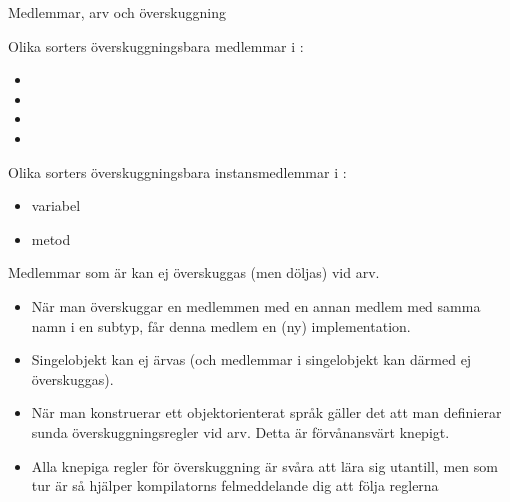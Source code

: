 



\begin{Slide}{Medlemmar, arv och överskuggning}\SlideFontTiny
\begin{multicols}{2}
\noindent Olika sorters överskuggningsbara medlemmar i :
\begin{itemize}
\item {}
\item {}
\item {}
\item {}
\end{itemize}

\columnbreak

\pause

\noindent Olika sorters överskuggningsbara instansmedlemmar i :
\begin{itemize}
\item variabel
\item metod
\end{itemize}

{\SlideFontTiny\noindent Medlemmar som är  kan ej överskuggas (men döljas) vid arv.}

\vspace{0.5em}
\end{multicols}

\pause
\begin{itemize}\SlideFontTiny
\item När man överskuggar  en medlemmen med en annan medlem med samma namn i en subtyp, får denna medlem en (ny) implementation.

\item Singelobjekt kan ej ärvas (och medlemmar i singelobjekt kan därmed ej överskuggas).

\item När man konstruerar ett objektorienterat språk gäller det att man definierar sunda överskuggningsregler vid arv. Detta är förvånansvärt knepigt.

\item Alla knepiga regler för överskuggning är svåra att lära sig utantill, men som tur är så hjälper kompilatorns felmeddelande dig att följa reglerna \code{:)}
\end{itemize}
\end{Slide}


